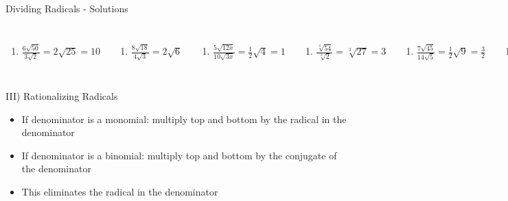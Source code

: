 \documentclass[aspectratio=169]{beamer}
\begin{document}
\begin{frame}{Dividing Radicals - Solutions}
\begin{tcolorbox}[colback=lightgray,colframe=primary,title=Solutions]
\footnotesize
\begin{columns}[T]
\begin{enumerate}[label=2\textbf{a})]
  \item $\frac{6\sqrt{50}}{3\sqrt{2}} = 2\sqrt{25} = 10$
\end{enumerate}
\begin{enumerate}[label=2\textbf{b})]
  \item $\frac{8\sqrt{18}}{4\sqrt{3}} = 2\sqrt{6}$
\end{enumerate}
\begin{enumerate}[label=2\textbf{c})]
  \item $\frac{5\sqrt{12x}}{10\sqrt{3x}} = \frac{1}{2}\sqrt{4} = 1$
\end{enumerate}
\begin{enumerate}[label=2\textbf{d})]
  \item $\frac{\sqrt[3]{54}}{\sqrt[3]{2}} = \sqrt[3]{27} = 3$
\end{enumerate}
\begin{enumerate}[label=2\textbf{e})]
  \item $\frac{7\sqrt{45}}{14\sqrt{5}} = \frac{1}{2}\sqrt{9} = \frac{3}{2}$
\end{enumerate}
\begin{enumerate}[label=2\textbf{f})]
  \item $\frac{\sqrt{32y^3}}{4\sqrt{2y}} = \frac{1}{4}\sqrt{16y^2} = \frac{1}{4} \times 4y = y$
\end{enumerate}
\end{columns}
\end{tcolorbox}
\end{frame}

\begin{frame}{III) Rationalizing Radicals}
\begin{tcolorbox}[colback=lightgray,colframe=primary,title=Rules]
\footnotesize
\begin{itemize}
  \item If denominator is a monomial: multiply top and bottom by the radical in the denominator
  \item If denominator is a binomial: multiply top and bottom by the conjugate of the denominator
  \item This eliminates the radical in the denominator
\end{itemize}
\end{tcolorbox}
\end{frame}
\end{document}

